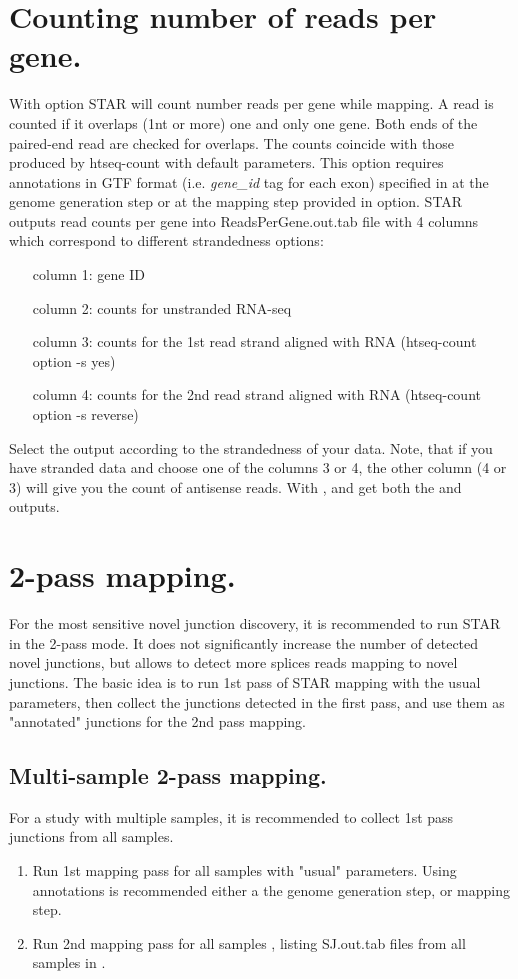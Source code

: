 \documentclass[12pt]{article}
\begin{document}
\section{Counting number of reads per gene.}
With   option STAR will count number reads per gene while mapping.
A read is counted if it overlaps (1nt or more) one and only one gene. Both ends of the paired-end read are checked for overlaps.
The counts coincide with those produced by htseq-count with default parameters.
This option requires annotations in GTF format (i.e. \emph{gene\_id} tag for each exon) specified in  at the genome generation step or at the mapping step provided in option.
STAR outputs read counts per gene into ReadsPerGene.out.tab file with 4 columns which correspond to different strandedness options:
\begin{itemize}[leftmargin=1in]
\item[column 1:] gene ID
\item[column 2:] counts for unstranded RNA-seq
\item[column 3:] counts for the 1st read strand aligned with RNA (htseq-count option -s yes)
\item[column 4:] counts for the 2nd read strand aligned with RNA (htseq-count option -s reverse)
\end{itemize}
Select the output according to the strandedness of your data.
Note, that if you have stranded data and choose one of the columns 3 or 4, the other column (4 or 3) will give you the count of antisense reads.
With   , and get both the  and  outputs.


\section{2-pass mapping.}

For the most sensitive novel junction discovery, it is recommended to run STAR in the 2-pass mode. It does not significantly increase the number of detected novel junctions, but allows to detect more splices reads mapping to novel junctions. The basic idea is to run 1st pass of STAR mapping with the usual parameters, then collect the junctions detected in the first pass, and use them as "annotated" junctions for the 2nd pass mapping.

\subsection{Multi-sample 2-pass mapping.}
For a study with multiple samples, it is recommended to collect 1st pass junctions from all samples.
\begin{enumerate}
\item Run 1st mapping pass for all samples with "usual" parameters. Using annotations is recommended either a the genome generation step, or mapping step.
\item Run 2nd mapping pass for all samples , listing SJ.out.tab files from all samples in  .
\end{enumerate}
\end{document}
